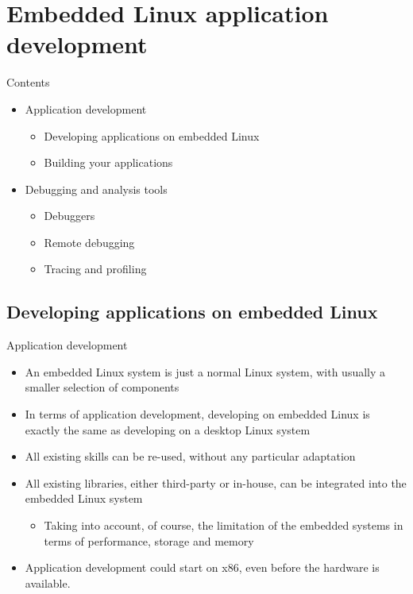 \section{Embedded Linux application development}

\begin{frame}{Contents}
  \begin{itemize}
  \item Application development
    \begin{itemize}
    \item Developing applications on embedded Linux
    \item Building your applications
    \end{itemize}
  \item Debugging and analysis tools
    \begin{itemize}
    \item Debuggers
    \item Remote debugging
    \item Tracing and profiling
    \end{itemize}
  \end{itemize}
\end{frame}

\subsection{Developing applications on embedded Linux}

\begin{frame}{Application development}
  \begin{itemize}
  \item An embedded Linux system is just a normal Linux system, with
    usually a smaller selection of components
  \item In terms of application development, developing on embedded
    Linux is exactly the same as developing on a desktop Linux system
  \item All existing skills can be re-used, without any particular
    adaptation
  \item All existing libraries, either third-party or in-house, can be
    integrated into the embedded Linux system
    \begin{itemize}
    \item Taking into account, of course, the limitation of the
      embedded systems in terms of performance, storage and memory
    \end{itemize}
  \item Application development could start on x86, even before
      the hardware is available.
  \end{itemize}
\end{frame}

